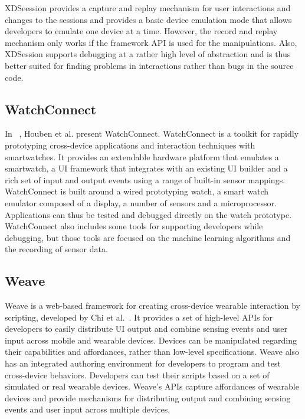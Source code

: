 XDSeession provides a capture and replay mechanism for user interactions and changes to the sessions and provides a basic device emulation mode that allows developers to emulate one device at a time. However, the record and replay mechanism only works if the framework API is used for the manipulations. Also, XDSession supports debugging at a rather high level of abstraction and is thus better suited for finding problems in interactions rather than bugs in the source code.

\subsection{WatchConnect}

In ~\cite{watchconnect2015}, Houben et al. present WatchConnect. WatchConnect is a toolkit for rapidly prototyping cross-device applications and interaction techniques with smartwatches. It provides an extendable hardware platform that emulates a smartwatch, a UI framework that integrates with an existing UI builder and a rich set of input and output events using a range of built-in sensor mappings. WatchConnect is built around a wired prototyping watch, a smart watch emulator composed of a display, a number of sensors and a microprocessor. Applications can thus be tested and debugged directly on the watch prototype. WatchConnect also includes some tools for supporting developers while debugging, but those tools are focused on the machine learning algorithms and the recording of sensor data.

\subsection{Weave}

Weave is a web-based framework for creating cross-device wearable interaction by scripting, developed by Chi et al.~\cite{weave2015}. It provides a set of high-level APIs for developers to easily distribute UI output and combine sensing events and user input across mobile and wearable devices. Devices can be manipulated regarding their capabilities and affordances, rather than low-level specifications. Weave also has an integrated authoring environment for developers to program and test cross-device behaviors. Developers can test their scripts based on a set of simulated or real wearable devices. Weave's APIs capture affordances of wearable devices and provide mechanisms for distributing output and combining sensing events and user input across multiple devices.

